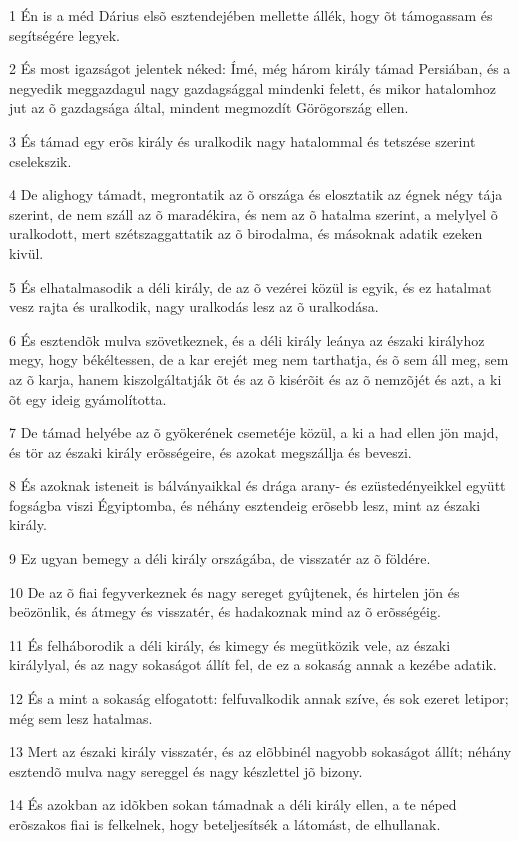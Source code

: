 \par 1 Én is a méd Dárius elsõ esztendejében mellette állék, hogy õt támogassam és segítségére legyek.
\par 2 És most igazságot jelentek néked: Ímé, még három király támad Persiában, és a negyedik meggazdagul nagy gazdagsággal mindenki felett, és mikor hatalomhoz jut az õ gazdagsága által, mindent megmozdít Görögország ellen.
\par 3 És támad egy erõs király és uralkodik nagy hatalommal és tetszése szerint cselekszik.
\par 4 De alighogy támadt, megrontatik az õ országa és elosztatik az égnek négy tája szerint, de nem száll az õ maradékira, és nem az õ hatalma szerint, a melylyel õ uralkodott, mert szétszaggattatik az õ birodalma, és másoknak adatik ezeken kivül.
\par 5 És elhatalmasodik a déli király, de az õ vezérei közül is egyik, és ez hatalmat vesz rajta és uralkodik, nagy uralkodás lesz az õ uralkodása.
\par 6 És esztendõk mulva szövetkeznek, és a déli király leánya az északi királyhoz megy, hogy békéltessen, de a kar erejét meg nem tarthatja, és õ sem áll meg, sem az õ karja, hanem kiszolgáltatják õt és az õ kisérõit és az õ nemzõjét és azt, a ki õt egy ideig gyámolította.
\par 7 De támad helyébe az õ gyökerének csemetéje közül, a ki a had ellen jön majd, és tör az északi király erõsségeire, és azokat megszállja és beveszi.
\par 8 És azoknak isteneit is bálványaikkal és drága arany- és ezüstedényeikkel együtt fogságba viszi Égyiptomba, és néhány esztendeig erõsebb lesz, mint az északi király.
\par 9 Ez ugyan bemegy a déli király országába, de visszatér az õ földére.
\par 10 De az õ fiai fegyverkeznek és nagy sereget gyûjtenek, és hirtelen jön és beözönlik, és átmegy és visszatér, és hadakoznak mind az õ erõsségéig.
\par 11 És felháborodik a déli király, és kimegy és megütközik vele, az északi királylyal, és az nagy sokaságot állít fel, de ez a sokaság annak a kezébe adatik.
\par 12 És a mint a sokaság elfogatott: felfuvalkodik annak szíve, és sok ezeret letipor; még sem lesz hatalmas.
\par 13 Mert az északi király visszatér, és az elõbbinél nagyobb sokaságot állít; néhány esztendõ mulva nagy sereggel és nagy készlettel jõ bizony.
\par 14 És azokban az idõkben sokan támadnak a déli király ellen, a te néped erõszakos fiai is felkelnek, hogy beteljesítsék a látomást, de elhullanak.
